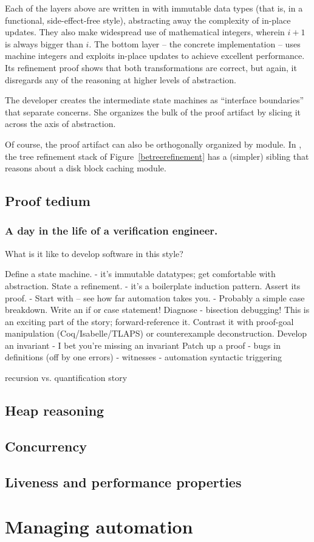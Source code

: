 Each of the layers above are written in with immutable data types
(that is, in a functional, side-effect-free style), abstracting away
the complexity of in-place updates. They also make widespread use of
mathematical integers, wherein $i+1$ is always bigger than $i$.
The bottom layer -- the concrete implementation -- uses machine integers
and exploits in-place updates to achieve excellent performance.
Its refinement proof shows that both transformations are correct,
but again, it disregards any of the reasoning at higher levels of
abstraction.

The developer creates the intermediate state machines as
``interface boundaries'' that separate concerns.
She organizes the bulk of the proof artifact
by slicing it across the axis of abstraction.

Of course, the proof artifact can also be orthogonally organized
by module.
In {\veribetrfs},
the {\bepsilon}tree refinement stack of Figure~\ref{betreerefinement}
has a (simpler) sibling that reasons about a disk block caching module.

\subsection{Proof tedium}

\subsubsection{A day in the life of a verification engineer.}
What is it like to develop software in this style?

Define a state machine.
- it's immutable datatypes; get comfortable with abstraction.
State a refinement.
- it's a boilerplate induction pattern.
Assert its proof.
- Start with {} -- see how far automation takes you.
- Probably a simple case breakdown. Write an if or case statement!
Diagnose
- bisection debugging! This is an exciting part of the story;
  forward-reference it. Contrast it with proof-goal manipulation
  (Coq/Isabelle/TLAPS) or counterexample deconstruction.
Develop an invariant
- I bet you're missing an invariant
Patch up a proof
- bugs in definitions (off by one errors)
- witnesses
- automation syntactic triggering

recursion vs. quantification story

\subsection{Heap reasoning}

\subsection{Concurrency}

\subsection{Liveness and performance properties}

\section{Managing automation}
